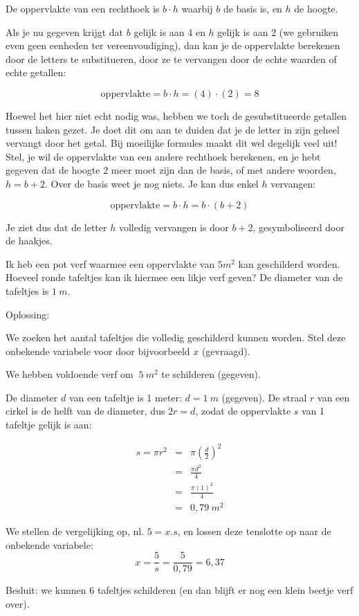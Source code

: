 \begin{voorbeeld}
	De oppervlakte van een rechthoek is $b \cdot h$ waarbij $b$ de basis is,
en $h$ de hoogte.

Als je nu gegeven krijgt dat $b$ gelijk is aan 4 en $h$ gelijk is
aan 2 (we gebruiken even geen eenheden ter vereenvoudiging), dan kan
je de oppervlakte berekenen door de letters te substitueren, door
ze te vervangen door de echte waarden of echte getallen:

\begin{equation*}
\mathrm{oppervlakte}=b\cdot h=(4)\cdot(2)=8
\end{equation*}

Hoewel het hier niet echt nodig was, hebben we toch de gesubstitueerde
getallen tussen haken gezet. Je doet dit om aan te duiden dat je de
letter in zijn geheel vervangt door het getal. Bij moeilijke formules
maakt dit wel degelijk veel uit! Stel, je wil de oppervlakte van een
andere rechthoek berekenen, en je hebt gegeven dat de hoogte 2 meer
moet zijn dan de basis, of met andere woorden, $h=b+2$. Over de basis
weet je nog niets. Je kan dus enkel $h$ vervangen:

\begin{equation*}
\mathrm{oppervlakte}=b\cdot h=b\cdot(b+2)
\end{equation*}

Je ziet dus dat de letter $h$ volledig vervangen is door $b+2$,
gesymboliseerd door de haakjes.
\end{voorbeeld}



\begin{voorbeeld}
Ik heb een pot verf waarmee een oppervlakte van $5m^2$
kan geschilderd worden. Hoeveel ronde tafeltjes kan ik hiermee een
likje verf geven? De diameter van de tafeltjes is $1~m$.

Oplossing: 

We zoeken het aantal tafeltjes die volledig geschilderd kunnen worden.
Stel deze onbekende variabele voor door bijvoorbeeld $x$ (gevraagd).

We hebben voldoende verf om $~5~m^2$ te schilderen (gegeven).

De diameter $d$ van een tafeltje is 1 meter: $d=1~m$ (gegeven). De straal $r$ van een cirkel is de helft van de diameter, dus $2r=d$, zodat de oppervlakte $s$ van 1 tafeltje gelijk is aan: 

\begin{eqnarray*}
s=\pi r^{2}&=&\pi\left(\frac{d}{2}\right)^{2}\\
&=&\frac{\pi d^{2}}{4}\\
&=&\frac{\pi(1)^{2}}{4}\\
&=&0,79~m^2
\end{eqnarray*}

We stellen de vergelijking op, nl. $5=x.s$, en lossen deze tenslotte op naar de onbekende variabele: 
\begin{equation*}
x=\frac{5}{s}=\frac{5}{0,79}=6,37
\end{equation*}

Besluit: we kunnen $6$ tafeltjes schilderen (en dan blijft er nog een
klein beetje verf over).

\end{voorbeeld}

